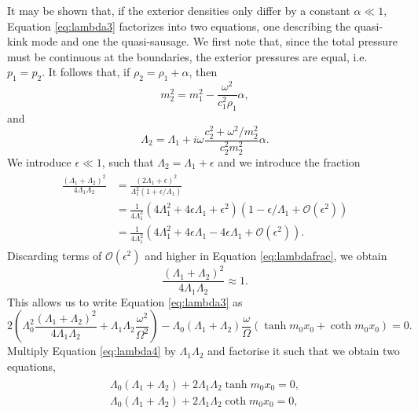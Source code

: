 \documentclass[12pt]{ociamthesis}
\begin{document}
It may be shown that, if the exterior densities only differ by a constant $\alpha \ll 1$, Equation \eqref{eq:lambda3} factorizes into two equations, one describing the quasi-kink mode and one the quasi-sausage.
We first note that, since the total pressure must be continuous at the boundaries, the exterior pressures are equal, i.e. $p_1 = p_2$.
It follows that, if $\rho_2 = \rho_1 + \alpha$, then
%
\begin{equation}
m_2^2 = m_1^2 - \frac{\omega^2}{c_1^2 \rho_1} \alpha,
\end{equation}
%
and
%
\begin{equation}
\Lambda_2 = \Lambda_1 + i \omega \frac{c_2^2 + \omega^2 / m_2^2}{c_2^2 m_2^2} \alpha.
\end{equation}
%
We introduce $\epsilon \ll 1$, such that $\Lambda_2 = \Lambda_1 + \epsilon$ and we introduce the fraction
%
\begin{align}
\begin{split}
\label{eq:lambdafrac}
\frac{(\Lambda_1 + \Lambda_2)^2}{4 \Lambda_1 \Lambda_2}
& = \frac{(2 \Lambda_1 + \epsilon)^2}{\Lambda_1^2 ( 1 + \epsilon/\Lambda_1)}
\\
& = \frac{1}{4 \Lambda_1^2} (4 \Lambda_1^2 + 4 \epsilon \Lambda_1 + \epsilon^2)
(1 - \epsilon / \Lambda_1 + \mathcal{O}(\epsilon^2))
\\
& = \frac{1}{4 \Lambda_1^2} (4 \Lambda_1^2 + 4 \epsilon \Lambda_1 - 4 \epsilon \Lambda_1 + \mathcal{O}(\epsilon^2)).
\end{split}
\end{align}
%
Discarding terms of $\mathcal{O}(\epsilon^2)$ and higher in Equation \eqref{eq:lambdafrac}, we obtain
%
\begin{equation}
\frac{(\Lambda_1 + \Lambda_2)^2}{4 \Lambda_1 \Lambda_2} \approx 1.
\end{equation}
%
This allows us to write Equation \eqref{eq:lambda3} as
%
\begin{equation}
\label{eq:lambda4}
2 \left( \Lambda_0^2 \frac{(\Lambda_1 + \Lambda_2)^2}{4 \Lambda_1 \Lambda_2} + \Lambda_1 \Lambda_2 \frac{\omega^2}{\Omega^2} \right)
- \Lambda_0 (\Lambda_1 + \Lambda_2) \frac{\omega}{\Omega} ( \tanh m_0 x_0 + \coth m_0 x_0 ) = 0.
\end{equation}
%
Multiply Equation \eqref{eq:lambda4} by $\Lambda_1 \Lambda_2$ and factorise it such that we obtain two equations,
%
\begin{align}
\begin{split}
\label{eq:lambda5}
\Lambda_0(\Lambda_1 + \Lambda_2) + 2 \Lambda_1 \Lambda_2 \tanh m_0 x_0 = 0,
\\
\Lambda_0(\Lambda_1 + \Lambda_2) + 2 \Lambda_1 \Lambda_2 \coth m_0 x_0 = 0,
\end{split}
\end{align}
\end{document}
